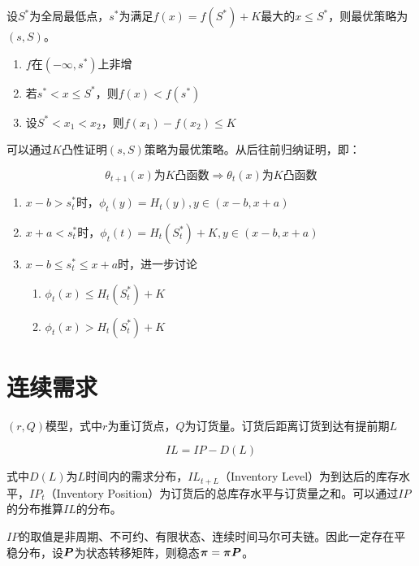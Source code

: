 \documentclass{../notes}
\begin{document}
    设$S^*$为全局最低点，$s^*$为满足$f(x) = f(S^*) + K$最大的$x\leq S^*$，则最优策略为$(s, S)$。

    \begin{enumerate}
        \item $f$在$(-\infty, s^*)$上非增
        \item 若$s^* < x \leq S^*$，则$f(x) < f(s^*)$
        \item 设$S^* < x_1 < x_2$，则$f(x_1) - f(x_2) \leq K$
    \end{enumerate}

    可以通过$K$凸性证明$(s, S)$策略为最优策略。从后往前归纳证明，即：

    \begin{equation*}
        \theta_{t+1}(x)\text{为$K$凸函数}\Rightarrow \theta_t(x)\text{为$K$凸函数}
    \end{equation*}

    \begin{enumerate}
        \item $x-b > s_t^*$时，$\phi_t(y) = H_t(y), y\in (x-b, x+a)$
        \item $x+a < s_t^*$时，$\phi_t(t) = H_t(S_t^*) + K, y\in (x-b, x+a)$
        \item $x-b\leq s_t^* \leq x+a$时，进一步讨论
        \begin{enumerate}[label=\Roman*.]
            \item $\phi_t(x) \leq H_t(S_t^*) + K$
            \item $\phi_t(x) > H_t(S_t^*) + K$
        \end{enumerate} 
    \end{enumerate}
    
    \section*{连续需求}

    $(r, Q)$模型，式中$r$为重订货点，$Q$为订货量。订货后距离订货到达有提前期$L$

    \begin{equation*}
        IL = IP - D(L)
    \end{equation*}

    式中$D(L)$为$L$时间内的需求分布，$IL_{t+L}$（Inventory Level）为到达后的库存水平，$IP_{t}$（Inventory Position）为订货后的总库存水平与订货量之和。可以通过$IP$的分布推算$IL$的分布。

    $IP$的取值是非周期、不可约、有限状态、连续时间马尔可夫链。因此一定存在平稳分布，设$\boldsymbol P$为状态转移矩阵，则稳态$\boldsymbol \pi = \boldsymbol \pi \boldsymbol P$。
\end{document}
